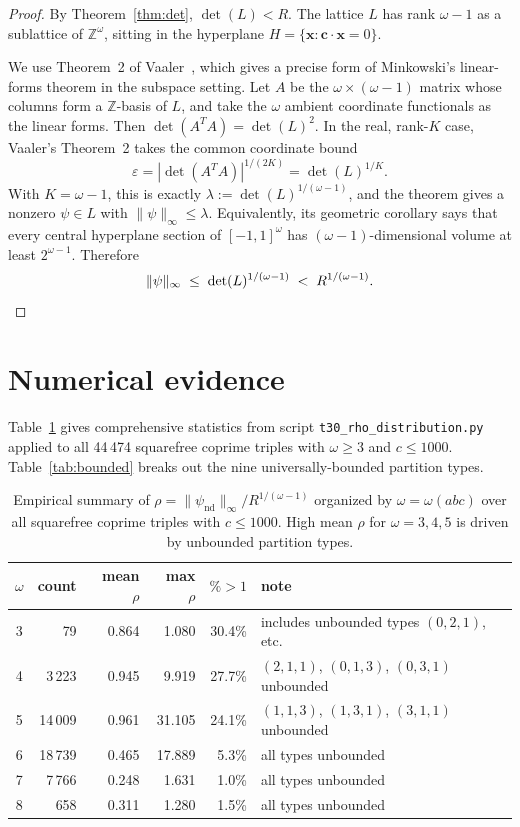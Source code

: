 \documentclass[12pt]{article}
\theoremstyle{definition}
\begin{document}
\begin{proof}
By Theorem~\ref{thm:det}, $\det(L) < R$.
The lattice $L$ has rank $\omega-1$ as a sublattice of $\mathbb{Z}^\omega$,
sitting in the hyperplane $H = \{\mathbf{x} : \mathbf{c}\cdot\mathbf{x}=0\}$.

We use Theorem~2 of Vaaler~\cite{Vaaler1979}, which gives a precise form of
Minkowski's linear-forms theorem in the subspace setting.  Let $A$ be the
$\omega\times(\omega-1)$ matrix whose columns form a $\mathbb{Z}$-basis of $L$,
and take the $\omega$ ambient coordinate functionals as the linear forms.
Then $\det(A^{T}A)=\det(L)^2$.  In the real, rank-$K$ case, Vaaler's
Theorem~2 takes the common coordinate bound
\[
  \varepsilon
  = |\det(A^{T}A)|^{1/(2K)}
  = \det(L)^{1/K}.
\]
With $K=\omega-1$, this is exactly
$\lambda:=\det(L)^{1/(\omega-1)}$, and the theorem gives a nonzero
$\psi\in L$ with $\|\psi\|_\infty\le\lambda$.  Equivalently, its geometric
corollary says that every central hyperplane section of $[-1,1]^\omega$ has
$(\omega-1)$-dimensional volume at least $2^{\omega-1}$.  Therefore
\[
  \|\psi\|_\infty \;\le\; \det(L)^{1/(\omega-1)} \;<\; R^{1/(\omega-1)}. \qedhere
\]
\end{proof}

\section{Numerical evidence}

Table~\ref{tab:data} gives comprehensive statistics from script
\texttt{t30\_rho\_distribution.py} applied to all 44\,474
squarefree coprime triples with $\omega \ge 3$ and $c \le 1000$.
Table~\ref{tab:bounded} breaks out the nine universally-bounded partition types.

\begin{table}[h]
\centering
\begin{tabular}{crrrrl}
\hline
$\omega$ & count & mean $\rho$ & max $\rho$ & $\%\!>\!1$ & note \\
\hline
3 & 79     & 0.864 & 1.080  & 30.4\% & includes unbounded types $(0,2,1)$, etc. \\
4 & 3\,223 & 0.945 & 9.919  & 27.7\% & $(2,1,1)$, $(0,1,3)$, $(0,3,1)$ unbounded \\
5 & 14\,009 & 0.961 & 31.105 & 24.1\% & $(1,1,3)$, $(1,3,1)$, $(3,1,1)$ unbounded \\
6 & 18\,739 & 0.465 & 17.889 & 5.3\%  & all types unbounded \\
7 & 7\,766  & 0.248 & 1.631  & 1.0\%  & all types unbounded \\
8 & 658     & 0.311 & 1.280  & 1.5\%  & all types unbounded \\
\hline
\end{tabular}
\caption{Empirical summary of $\rho = \|\psi_\mathrm{nd}\|_\infty / R^{1/(\omega-1)}$
  organized by $\omega = \omega(abc)$ over all squarefree coprime triples with $c \le 1000$.
  High mean $\rho$ for $\omega = 3,4,5$ is driven by unbounded partition types.}
\label{tab:data}
\end{table}
\end{document}
